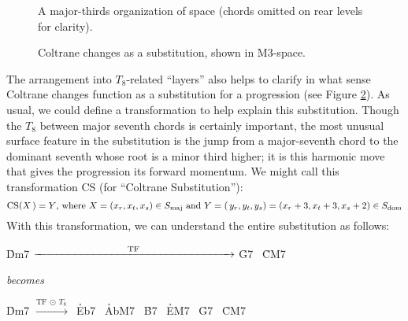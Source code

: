 \begin{figure}[tbp]
  \caption[A major-thirds organization of \tf space.]{A major-thirds
    organization of \tf space (\ii chords omitted on rear levels for clarity).}
\label{maj3:maj3-space}
\end{figure}

\begin{figure}[tbp]
  \caption{Coltrane changes as a \tfo substitution, shown in M3-space.}
\label{maj3:coltrane-subs-space}
\end{figure}

The arrangement into $T_8$-related ``layers'' also helps to clarify in what
sense Coltrane changes function as a substitution for a \tfo progression
(see Figure \ref{maj3:coltrane-subs-space}). As usual, we could define a
transformation to help explain this substitution. Though the $T_8$ between
major seventh chords is certainly important, the most unusual surface feature
in the substitution is the jump from a major-seventh chord to the dominant
seventh whose root is a minor third higher; it is this harmonic move that
gives the progression its forward momentum. We might call this transformation
CS (for ``Coltrane Substitution''):%
%
\begin{displaymath}
    \mathrm{CS}(X\,) = Y\text{, where}\ X = (x_r, x_t, x_s) \in S_{\mathrm{maj}}
    \text{ and}\
    Y = (\,y_r, y_t, y_s) = (x_r + 3, x_t + 3, x_s + 2) \in S_{\mathrm{dom}}
\end{displaymath}%
%
With this transformation, we can understand the entire \tfo substitution
as follows:%
%
\begin{center}
  \h{Dm7}  $\xrightarrow{\hspace{8.25em}\mathrm{TF}\hspace{8.25em}}$ \h{G7} \TFarrow\ \h{CM7}

  \vspace{.5em}
  \emph{becomes}
  \vspace{.5em}

  \h{Dm7}  $\xrightarrow{\mathrm{TF}\ \odot\ T_8\,}$\ \h{Eb7} \TFarrow\
  \h{AbM7} \CSarrow\ \h{B7} \TFarrow\
  \h{EM7}  \CSarrow\ \h{G7} \TFarrow\
  \h{CM7}
\end{center}

